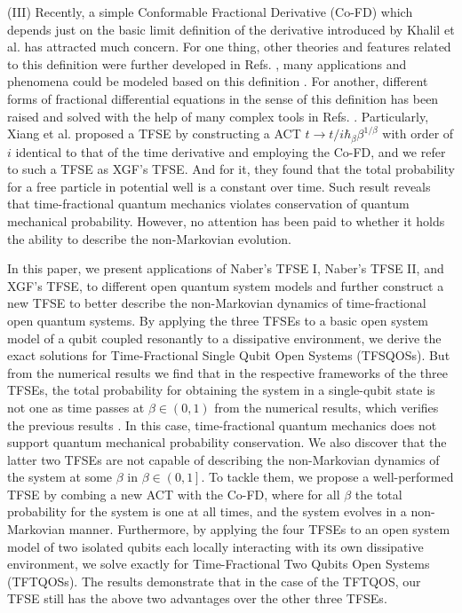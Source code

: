 \documentclass[
showpacs,  %
showkeys,  %
aps,       %
amsthm,    %
amsmath,   %
amsfonts,  %
amssymb    %
]{revtex4-1}          %
\begin{document}
(III) Recently, a simple Conformable Fractional Derivative (Co-FD) which depends just on the basic limit definition of the derivative introduced by Khalil et al. \cite{Khalil2014} has attracted much concern. For one thing, other theories and features related to this definition were further developed in Refs. \cite{Abdeljawad2015,Abdelhakim2018}, many applications and phenomena could be modeled based on this definition \cite{Hammad2014,Ayati2017,Kareem2017}. For another, different forms of fractional differential equations in the sense of this definition has been raised and solved with the help of many complex tools in Refs. \cite{ElAjou2019,Oqielat2020,Liaqat2022}. Particularly, Xiang et al. \cite{Xiang2019} proposed a TFSE by constructing a ACT $t\to t/i\hbar_\beta {\beta^{1/\beta}}$ with order of $i$ identical to that of the time derivative and employing the Co-FD, and we refer to such a TFSE as XGF's TFSE. And for it, they found that the total probability for a free particle in potential well is a constant over time. Such result reveals that time-fractional quantum mechanics violates conservation of quantum mechanical probability. However, no attention has been paid to whether it holds the ability to describe the non-Markovian evolution.

In this paper, we present applications of Naber's TFSE I, Naber's TFSE II, and XGF's TFSE, to different open quantum system models and further construct a new TFSE to better describe the non-Markovian dynamics of time-fractional open quantum systems. By applying the three TFSEs to a basic open system model of a qubit coupled resonantly to a dissipative environment, we derive the exact solutions for Time-Fractional Single Qubit Open Systems (TFSQOSs). But from the numerical results we find that in the respective frameworks of the three TFSEs, the total probability for obtaining the system in a single-qubit state is not one as time passes at $\beta\in\left({0,1}\right)$ from the numerical results, which verifies the previous results \cite{Naber2004,Achar2013,Xiang2019}. In this case, time-fractional quantum mechanics does not support quantum mechanical probability conservation. We also discover that the latter two TFSEs are not capable of describing the non-Markovian dynamics of the system at some $\beta$ in $\beta\in\left({0,1}\right]$. To tackle them, we propose a well-performed TFSE by combing a new ACT with the Co-FD, where for all $\beta$ the total probability for the system is one at all times, and the system evolves in a non-Markovian manner. Furthermore, by applying the four TFSEs to an open system model of two isolated qubits each locally interacting with its own dissipative environment, we solve exactly for Time-Fractional Two Qubits Open Systems (TFTQOSs). The results demonstrate that in the case of the TFTQOS, our TFSE still has the above two advantages over the other three TFSEs.
\end{document}
